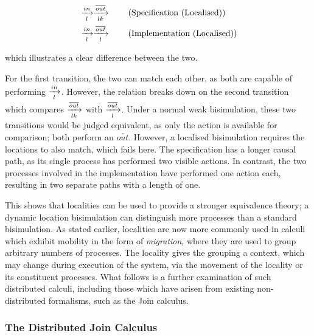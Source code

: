 \begin{align}
& \xrightarrow[l]{in} \xrightarrow[lk]{\overline{out}} \tag{Specification
(Localised)} \\
& \xrightarrow[l]{in} \xrightarrow[l]{\overline{out}} \tag{Implementation (Localised)}
\end{align}

\noindent which illustrates a clear difference between the two.

For the first transition, the two can match each other, as both are
capable of performing $\xrightarrow[l]{in}$.  However, the relation
breaks down on the second transition which compares $\xrightarrow[lk]{\overline{out}}$
with $\xrightarrow[l]{\overline{out}}$.  Under a normal weak
bisimulation, these two transitions would be judged equivalent, as only
the action is available for comparison; both perform an
$\overline{out}$.  However, a localised bisimulation requires the
locations to also match, which fails here.  The specification has a
longer causal path, as its single process has performed two visible
actions.  In contrast, the two processes involved in the implementation
have performed one action each, resulting in two separate paths with a
length of one.

This shows that localities can be used to provide a stronger equivalence
theory; a dynamic location bisimulation can distinguish more processes
than a standard bisimulation.  As stated earlier, localities are now
more commonly used in calculi which exhibit mobility in the form of
\emph{migration}, where they are used to group arbitrary numbers of
processes.  The locality gives the grouping a context, which may change
during execution of the system, via the movement of the locality or its
constituent processes.  What follows is a further examination of such
distributed calculi, including those which have arisen from existing
non-distributed formalisms, such as the Join calculus.



\subsubsection{The Distributed Join Calculus}

